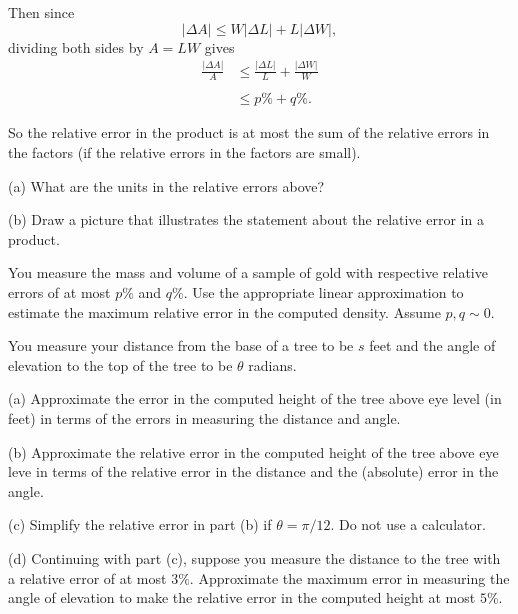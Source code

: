 \documentclass{ximera}
\begin{document}
\begin{example}
\begin{explanation}
Then since
\[
  | \Delta A | \leq W|\Delta L| + L |\Delta W| ,
\]
dividing both sides by $A = LW$ gives
\begin{align*}
      \frac{|\Delta A|}{A} & \leq \frac{|\Delta L|}{L} + \frac{|\Delta W|}{W} \\ \\
                                   & \leq p\% + q\% .
\end{align*}

So the relative error in the product is at most the sum of the relative errors in the factors (if the relative errors in the factors are small).

\end{explanation}

\end{example}


\begin{question}   \label{Qefg547ji8}
(a) What are the units in the relative errors above?

(b) Draw a picture that illustrates the statement about the relative error in a product.
\end{question}
 
\begin{question}  \label{Qert5ty7}
You measure the mass and volume of a sample of gold with respective relative errors of at most $p\%$ and $q\%$. Use the appropriate linear approximation to estimate the maximum relative error in the computed density. Assume $p,q\sim 0$.

\end{question}



\begin{question}  \label{Qerfgghym}
You measure your distance from the base of a tree to be $s$ feet and the angle of elevation to the top of the tree to be $\theta$ radians.

(a) Approximate the error in the computed height of the tree above eye level (in feet) in terms of the errors in measuring the distance and angle.

(b) Approximate the relative error in the computed height of the tree above eye leve in terms of the relative error in the distance and the (absolute) error in the angle. 

(c) Simplify the relative error in part (b) if $\theta=\pi/12$. Do not use a calculator.

(d) Continuing with part (c), suppose you measure the distance to the tree with a relative error of at most $3\%$. Approximate the maximum error in measuring the angle of elevation to make the relative error in the computed height at most $5\%$.
\end{question}
\end{document}
